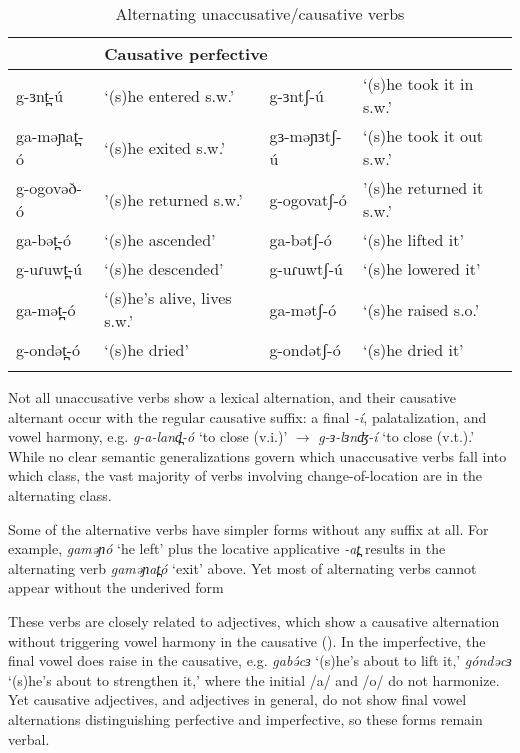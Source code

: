 \begin{table}
\begin{tabular}[t]{llll}
\lsptoprule
\multicolumn{2}{l}{Unaccusative perfective}	& 	\multicolumn{2}{l}{Causative perfective} \\
\midrule
g-ɜnt̪-ú		& `(s)he entered s.w.'	& g-ɜntʃ-ú	&	`(s)he took it in s.w.' \\
ga-məɲat̪-ó 	& `(s)he exited s.w.' & 	gɜ-məɲɜtʃ-ú 	& `(s)he took it out s.w.' \\
g-ogovəð-ó	& '(s)he returned s.w.' & g-ogovatʃ-ó	& 	'(s)he returned it s.w.' \\
ga-bət̪-ó 	& `(s)he ascended' & ga-bətʃ-ó &  `(s)he lifted it' \\  
g-uɾuwt̪-ú 	& `(s)he descended' & g-uɾuwtʃ-ú &  `(s)he lowered it' \\
ga-mət̪-ó 	& `(s)he's alive, lives s.w.' & ga-mətʃ-ó &  `(s)he raised s.o.' \\
g-ondət̪-ó 	& `(s)he dried' & 	g-ondətʃ-ó 	& ‘(s)he dried it’ \\
\lspbottomrule
  	 \end{tabular}
\caption{Alternating unaccusative/causative verbs}	\label{tab:ch11:ucalt} 
\end{table}
Not all unaccusative verbs show a lexical alternation, and their causative alternant occur with the regular causative suffix: a final \textit{-í}, palatalization, and vowel harmony, e.g. \textit{g-a-land̪-ó} `to close (v.i.)' $\rightarrow$ \textit{g-ɜ-lɜnʤ-í} ‘to close (v.t.).’ While no clear semantic generalizations govern which unaccusative verbs fall into which class, the vast majority of verbs involving change-of-location are in the alternating class.

Some of the alternative verbs have simpler forms without any suffix at all. For example, \textit{gaməɲó} `he left' plus the locative applicative \textit{-at̪} results in the alternating verb \textit{gaməɲat̪ó} 	 `exit' above. Yet most of alternating verbs cannot appear without the underived form

These verbs are closely related to adjectives, which show a causative alternation without triggering vowel harmony in the causative (). In the imperfective, the final vowel does raise in the causative, e.g. \textit{gabə́cɜ} `(s)he's about to lift it,' \textit{góndəcɜ} `(s)he's about to strengthen it,' where the initial /a/ and /o/ do not harmonize. Yet causative adjectives, and adjectives in general, do not show final vowel alternations distinguishing perfective and imperfective, so these forms remain verbal.

